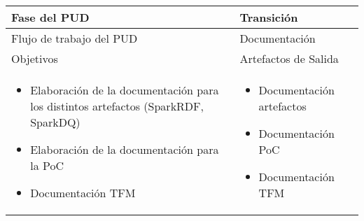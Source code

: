 \vspace{1cm}
\begin{tabular}{|p{}|p{}|}

\hline

\cellcolor[gray]{0.7}Fase del \acs{PUD} & Transición
 \\
\hline

\cellcolor[gray]{0.7}Flujo de trabajo del \acs{PUD} & Documentación

 \\
\hline


\cellcolor[gray]{0.7}Objetivos  &
\cellcolor[gray]{0.7}Artefactos de Salida \\
\hline

\begin{itemize}
\item Elaboración de la documentación para los distintos artefactos (SparkRDF, SparkDQ)
\item Elaboración de la documentación para la \acs{PoC}
\item Documentación \acs{TFM}
\end{itemize}

&

\begin{itemize}
\item Documentación artefactos
\item Documentación \acs{PoC}
\item Documentación \acs{TFM}
\end{itemize}
\\
\hline
\end{tabular}


